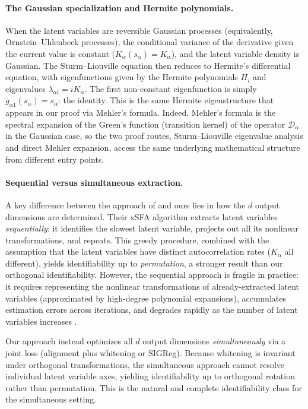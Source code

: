 \paragraph{The Gaussian specialization and Hermite polynomials.}
When the latent variables are reversible Gaussian processes (equivalently, Ornstein--Uhlenbeck processes), the conditional variance of the derivative given the current value is constant ($K_\alpha(s_\alpha) = K_\alpha$), and the latent variable density is Gaussian.
The Sturm--Liouville equation then reduces to Hermite's differential equation, with eigenfunctions given by the Hermite polynomials $H_i$ and eigenvalues $\lambda_{\alpha i} = i K_\alpha$.
The first non-constant eigenfunction is simply $g_{\alpha 1}(s_\alpha) = s_\alpha$: the identity.
This is the same Hermite eigenstructure that appears in our proof via Mehler's formula.
Indeed, Mehler's formula is the spectral expansion of the Green's function (transition kernel) of the operator $\mathcal{D}_\alpha$ in the Gaussian case, so the two proof routes, Sturm--Liouville eigenvalue analysis and direct Mehler expansion, access the same underlying mathematical structure from different entry points.

\paragraph{Sequential versus simultaneous extraction.}
A key difference between the approach of \citet{sprekeler2014} and ours lies in how the $d$ output dimensions are determined.
Their xSFA algorithm extracts latent variables \emph{sequentially}: it identifies the slowest latent variable, projects out all its nonlinear transformations, and repeats.
This greedy procedure, combined with the assumption that the latent variables have distinct autocorrelation rates ($K_\alpha$ all different), yields identifiability up to \emph{permutation}, a stronger result than our orthogonal identifiability.
However, the sequential approach is fragile in practice: it requires representing the nonlinear transformations of already-extracted latent variables (approximated by high-degree polynomial expansions), accumulates estimation errors across iterations, and degrades rapidly as the number of latent variables increases \citep[Section~5]{sprekeler2014}.

Our approach instead optimizes all $d$ output dimensions \emph{simultaneously} via a joint loss (alignment plus whitening or SIGReg).
Because whitening is invariant under orthogonal transformations, the simultaneous approach cannot resolve individual latent variable axes, yielding identifiability up to orthogonal rotation rather than permutation.
This is the natural and complete identifiability class for the simultaneous setting.


